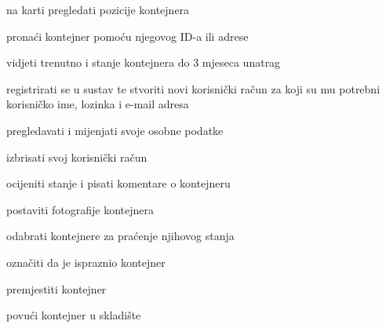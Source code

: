			
			\begin{packed_enum}
				\item  {}
				
				\begin{packed_enum}
					
					\item na karti pregledati pozicije kontejnera
					\item pronaći kontejner pomoću njegovog ID-a ili adrese
					\item vidjeti trenutno i stanje kontejnera do 3 mjeseca unatrag
					\item registrirati se u sustav te stvoriti novi korisnički račun za koji su mu potrebni korisničko ime, lozinka i e-mail adresa
					
				\end{packed_enum}
			
				\item  {}
				
				\begin{packed_enum}
					
					\item pregledavati i mijenjati svoje osobne podatke
					\item izbrisati svoj korisnički račun
					\item ocijeniti stanje i pisati komentare o kontejneru
					\item postaviti fotografije kontejnera
					\item odabrati kontejnere za praćenje njihovog stanja
					
				\end{packed_enum}
				
					\item {}
				
				\begin{packed_enum}
				
					\item označiti da je ispraznio kontejner 
					\item premjestiti kontejner
					\item povući kontejner u skladište
				
				\end{packed_enum}	
				
				\item {}		
				

\end{packed_enum}
